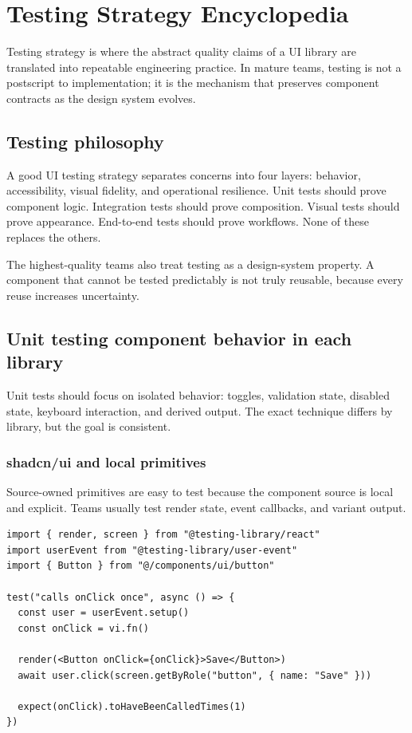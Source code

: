 \clearpage
\section{Testing Strategy Encyclopedia}

Testing strategy is where the abstract quality claims of a UI library are translated into repeatable engineering practice. In mature teams, testing is not a postscript to implementation; it is the mechanism that preserves component contracts as the design system evolves.

\subsection{Testing philosophy}
A good UI testing strategy separates concerns into four layers: behavior, accessibility, visual fidelity, and operational resilience. Unit tests should prove component logic. Integration tests should prove composition. Visual tests should prove appearance. End-to-end tests should prove workflows. None of these replaces the others.

The highest-quality teams also treat testing as a design-system property. A component that cannot be tested predictably is not truly reusable, because every reuse increases uncertainty.

\subsection{Unit testing component behavior in each library}
Unit tests should focus on isolated behavior: toggles, validation state, disabled state, keyboard interaction, and derived output. The exact technique differs by library, but the goal is consistent.

\subsubsection{shadcn/ui and local primitives}
Source-owned primitives are easy to test because the component source is local and explicit. Teams usually test render state, event callbacks, and variant output.

\begin{verbatim}
import { render, screen } from "@testing-library/react"
import userEvent from "@testing-library/user-event"
import { Button } from "@/components/ui/button"

test("calls onClick once", async () => {
  const user = userEvent.setup()
  const onClick = vi.fn()

  render(<Button onClick={onClick}>Save</Button>)
  await user.click(screen.getByRole("button", { name: "Save" }))

  expect(onClick).toHaveBeenCalledTimes(1)
})
\end{verbatim}

